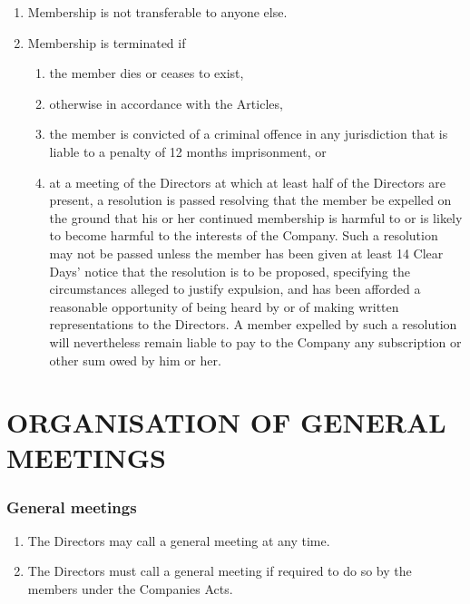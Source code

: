 \documentclass[a4paper,12pt]{article}
\begin{document}
\begin{enumerate}
  \color{red}
  \item Membership is not transferable to anyone else. %
  \item Membership is terminated if%
  \begin{enumerate}
    \item the member dies or ceases to exist, %
    \item otherwise in accordance with the Articles,\color{black} %
    \item the member is convicted of a criminal offence in any jurisdiction that is liable to a penalty of 12 months imprisonment, or %
    \item at a meeting of the Directors at which at least half of the Directors are present, a resolution is passed resolving that the member be expelled on the ground that his or her continued membership is harmful to or is likely to become harmful to the interests of the Company. Such a resolution may not be passed unless the member has been given at least 14 Clear Days' notice that the resolution is to be proposed, specifying the circumstances alleged to justify expulsion, and has been afforded a reasonable opportunity of being heard by or of making written representations to the Directors. A member expelled by such a resolution will nevertheless remain liable to pay to the Company any subscription or other sum owed by him or her.
  \end{enumerate}
\end{enumerate}

\part*{ORGANISATION OF GENERAL MEETINGS}

\section{General meetings}

\begin{enumerate}
  \item The Directors may call a general meeting at any time.
  \item The Directors must call a general meeting if required to do so by the members under the Companies Acts.
\end{enumerate}
\end{document}
